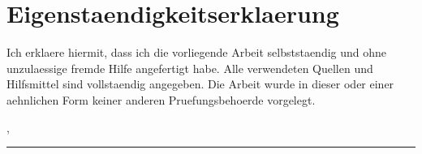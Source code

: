 \chapter*{Eigenstaendigkeitserklaerung}

Ich erklaere hiermit, dass ich die vorliegende Arbeit selbststaendig und ohne
unzulaessige fremde Hilfe angefertigt habe. Alle verwendeten Quellen und
Hilfsmittel sind vollstaendig angegeben. Die Arbeit wurde in dieser oder einer
aehnlichen Form keiner anderen Pruefungsbehoerde vorgelegt.

\vspace{2cm}
\noindent \thesisCity, \thesisDate

\vspace{1.5cm}
\noindent\rule{6cm}{0.4pt}\\
\thesisAuthor
